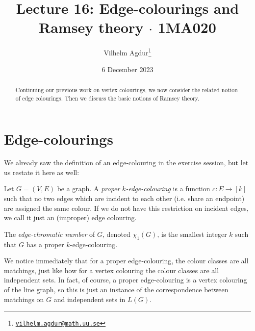 \documentclass[nobib]{tufte-handout}
\title{Lecture 16: Edge-colourings and Ramsey theory $\cdot$ 1MA020}
\author[Vilhelm Agdur]{Vilhelm Agdur\thanks{\href{mailto:vilhelm.agdur@math.uu.se}{\nolinkurl{vilhelm.agdur@math.uu.se}}}}
\date{6 December 2023}
\begin{document}
\maketitle%

\begin{abstract}
\noindent
Continuing our previous work on vertex colourings, we now consider the related notion of edge colourings. Then we discuss the basic notions of Ramsey theory.
\end{abstract}

\section{Edge-colourings}

We already saw the definition of an edge-colouring in the exercise session, but let us restate it here as well:

\begin{definition}
    Let $G = (V,E)$ be a graph. A \emph{proper} \emph{$k$-edge-colouring} is a function $c: E \to [k]$ such that no two edges which are incident to each other (i.e. share an endpoint) are assigned the same colour. If we do not have this restriction on incident edges, we call it just an (improper) edge colouring.

    The \emph{edge-chromatic number} of $G$, denoted $\chi_1(G)$, is the smallest integer $k$ such that $G$ has a proper $k$-edge-colouring.
\end{definition}

\begin{remark}
    We notice immediately that for a proper edge-colouring, the colour classes are all matchings, just like how for a vertex colouring the colour classes are all independent sets. In fact, of course, a proper edge-colouring is a vertex colouring of the line graph, so this is just an instance of the correspondence between matchings on $G$ and independent sets in $L(G)$.
\end{remark}
\end{document}
